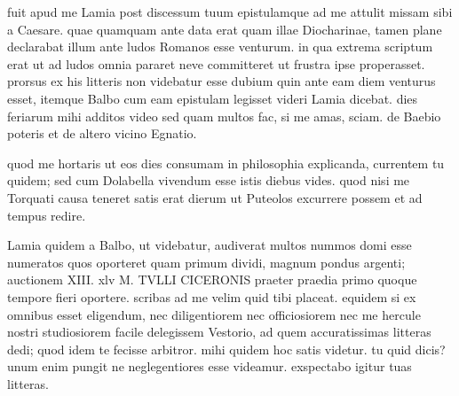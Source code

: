 


 fuit apud me Lamia post discessum tuum epistulamque ad me attulit missam sibi a Caesare. quae quamquam ante data erat quam illae Diocharinae, tamen plane declarabat illum ante ludos Romanos esse venturum. in qua extrema scriptum erat ut ad ludos omnia pararet neve committeret ut frustra ipse properasset. prorsus ex his litteris non videbatur esse dubium quin ante eam diem venturus esset, itemque Balbo cum eam epistulam legisset videri Lamia dicebat. dies feriarum mihi additos video sed quam multos fac, si me amas, sciam. de Baebio poteris et de altero vicino Egnatio.

 quod me hortaris ut eos dies consumam in philosophia explicanda, currentem tu quidem; sed cum Dolabella vivendum esse istis diebus vides. quod nisi me Torquati causa teneret satis erat dierum ut Puteolos excurrere possem et ad tempus redire.

 Lamia quidem a Balbo, ut videbatur, audiverat multos nummos domi esse numeratos quos oporteret quam primum dividi, magnum pondus argenti; auctionem XIII. xlv M. TVLLI CICERONIS praeter praedia primo quoque tempore fieri oportere. scribas ad me velim quid tibi placeat. equidem si ex omnibus esset eligendum, nec diligentiorem nec officiosiorem nec me hercule nostri studiosiorem facile delegissem Vestorio, ad quem accuratissimas litteras dedi; quod idem te fecisse arbitror. mihi quidem hoc satis videtur. tu quid dicis? unum enim pungit ne neglegentiores esse videamur. exspectabo igitur tuas litteras.
